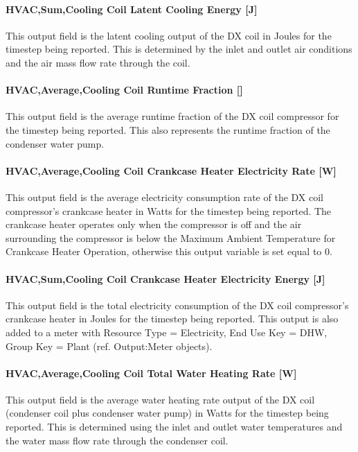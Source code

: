 \paragraph{HVAC,Sum,Cooling Coil Latent Cooling Energy {[}J{]}}\label{vshpwhheating-output-cooling-coil-latent-cooling-energy}
This output field is the latent cooling output of the DX coil in Joules for the timestep being reported.
This is determined by the inlet and outlet air conditions and the air mass flow rate through the coil.

\paragraph{HVAC,Average,Cooling Coil Runtime Fraction {[}{]}}\label{vshpwhheating-output-cooling-coil-runtime-fraction}
This output field is the average runtime fraction of the DX coil compressor for the timestep being reported.
This also represents the runtime fraction of the condenser water pump.

\paragraph{HVAC,Average,Cooling Coil Crankcase Heater Electricity Rate {[}W{]}}\label{vshpwhheating-output-cooling-coil-crankcase-heater-electric-power}
This output field is the average electricity consumption rate of the DX coil compressor's crankcase heater in Watts for the timestep being reported.
The crankcase heater operates only when the compressor is off and the air surrounding the compressor is below the Maximum Ambient Temperature for Crankcase Heater Operation, otherwise this output variable is set equal to 0.

\paragraph{HVAC,Sum,Cooling Coil Crankcase Heater Electricity Energy {[}J{]}}\label{vshpwhheating-output-cooling-coil-crankcase-heater-electric-energy}
This output field is the total electricity consumption of the DX coil compressor's crankcase heater in Joules for the timestep being reported.
This output is also added to a meter with Resource Type = Electricity, End Use Key = DHW, Group Key = Plant (ref. Output:Meter objects).

\paragraph{HVAC,Average,Cooling Coil Total Water Heating Rate {[}W{]}}\label{vshpwhheating-output-cooling-coil-total-water-heating-rate}
This output field is the average water heating rate output of the DX coil (condenser coil plus condenser water pump) in Watts for the timestep being reported.
This is determined using the inlet and outlet water temperatures and the water mass flow rate through the condenser coil.

